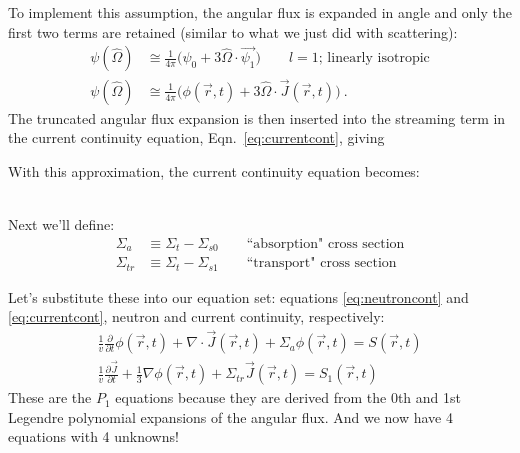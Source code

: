 \documentclass[12pt]{article}
\newif\ifeqns
\newcommand{\vOmega}{\ensuremath{\hat{\Omega}}}
\begin{document}
To implement this assumption, the angular flux is expanded in angle and only the first two terms are retained (similar to what we just did with scattering):  
%
\begin{align*}
\psi(\vOmega) &\cong  \frac{1}{4\pi}\bigl( \psi_{0} + 3\vOmega \cdot \vec{\psi_{1}} \bigr) \qquad l=1 \text{; linearly isotropic} \\
%
\psi(\vOmega) &\cong \frac{1}{4\pi}\bigl(\phi(\vec{r}, t) + 3 \vOmega \cdot \vec{J}(\vec{r}, t)\bigr) \:.
\end{align*}
The truncated angular flux expansion is then inserted into the streaming term in the current continuity equation, Eqn.\ \eqref{eq:currentcont}, giving 
%
\ifeqns
\begin{align*}
  \nabla \cdot \frac{1}{4\pi} \int d \vOmega \:\vOmega \vOmega  \bigl(\psi_{0} + 3\vOmega \cdot \vec{\psi_{1}}\bigr) &=  
%
\nabla \cdot \frac{1}{4\pi} \bigl[\int d \vOmega \:\vOmega \vOmega  \psi_{0}
%
+ 3 \underbrace{\int d \vOmega \:\vOmega \vOmega \vOmega \cdot \vec{\psi_{1}}}_{0} \bigr] \nonumber \\
% 
&= \nabla \cdot \frac{1}{4\pi} \frac{4\pi}{3}\bar{\bar{I}} \phi(\vec{r}, t) \\
%
  &= \frac{1}{3} \nabla \phi(\vec{r}, t) \:.
\end{align*}
\else
\vspace*{10em}
\fi

With this approximation, the current continuity equation becomes:
\ifeqns
\begin{equation}
\frac{1}{v}\frac{\partial \vec{J}}{\partial t} 
+ \frac{1}{3} \nabla \phi(\vec{r}, t) +
\Sigma_t  \vec{J}(\vec{r}, t) =
\Sigma_{s1} \vec{J}(\vec{r},t)
+ S_{1}(\vec{r}, t) \nonumber
\end{equation}
\else
\vspace*{3em}\\
\fi
%
Next we'll define:
\begin{align*}
\Sigma_a &\equiv \Sigma_t - \Sigma_{s0} \qquad \text{``absorption" cross section}\\
\Sigma_{tr} &\equiv \Sigma_t - \Sigma_{s1} \qquad \text{``transport" cross section}
\end{align*}

Let's substitute these into our equation set: equations \eqref{eq:neutroncont} and \eqref{eq:currentcont}, neutron and current continuity, respectively:
%
\begin{align*}
\frac{1}{v}\frac{\partial}{\partial t}\phi(\vec{r}, t) + 
\nabla \cdot \vec{J}(\vec{r}, t) + 
\Sigma_a \phi(\vec{r}, t) =
S(\vec{r}, t) \\
%
\frac{1}{v}\frac{\partial \vec{J}}{\partial t} 
+ \frac{1}{3} \nabla \phi(\vec{r}, t) +
\Sigma_{tr}  \vec{J}(\vec{r}, t) =
S_{1}(\vec{r}, t) 
\end{align*}
%
These are the $P_1$ equations because they are derived from the 0th and 1st Legendre polynomial expansions of the angular flux. And we now have 4 equations with 4 unknowns!
\end{document}
